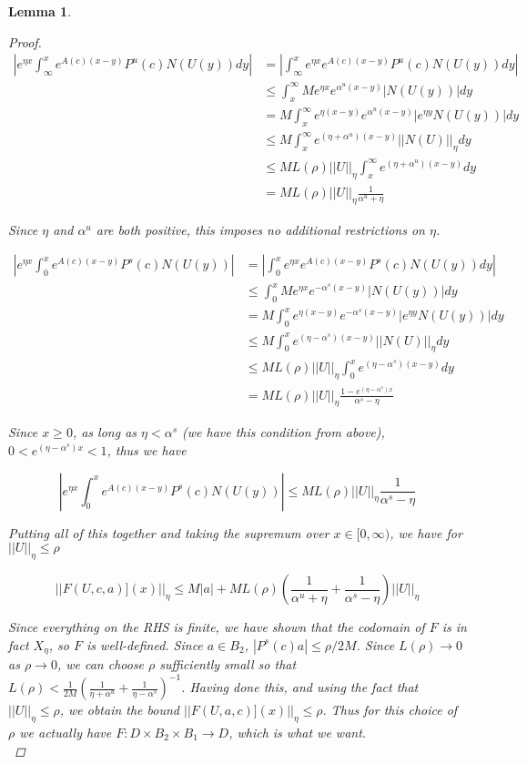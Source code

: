 \documentclass[12pt]{article}
\newtheorem{lemma}{Lemma}
\begin{document}
\begin{lemma}
\begin{proof}
\begin{align*}
\left| e^{\eta x} \int_\infty^x e^{A(c)(x - y)}P^u(c) N(U(y))dy \right| &= \left| \int_\infty^x e^{\eta x} e^{A(c)(x - y)}P^u(c) N(U(y))dy \right|\\
&\leq \int_x^\infty M e^{\eta x}e^{\alpha^u(x -y)}|N(U(y))|dy \\
&= M \int_x^\infty e^{\eta (x - y)}e^{\alpha^u(x -y)}| e^{\eta y} N(U(y))|dy \\
&\leq M \int_x^\infty e^{(\eta+\alpha^u)(x - y)} || N(U)||_\eta dy \\
&\leq M L(\rho) ||U||_\eta \int_x^\infty e^{(\eta+\alpha^u)(x - y)} dy \\
&= M L(\rho) ||U||_\eta \frac{1}{\alpha^u + \eta}
\end{align*}

Since $\eta$ and $\alpha^u$ are both positive, this imposes no additional restrictions on $\eta$.

\begin{align*}
\left| e^{\eta x} \int_0^x e^{A(c)(x - y)}P^s(c) N(U(y)) \right| &= \left| \int_0^x e^{\eta x} e^{A(c)(x - y)}P^s(c) N(U(y)) dy \right|\\
&\leq \int_0^x M e^{\eta x}e^{-\alpha^s(x -y)}|N(U(y))|dy \\
&= M \int_0^x e^{\eta (x - y)}e^{-\alpha^s(x -y)}| e^{\eta y} N(U(y))|dy \\
&\leq M \int_0^x e^{(\eta-\alpha^s)(x - y)} || N(U)||_\eta dy \\
&\leq M L(\rho) ||U||_\eta \int_0^x e^{(\eta-\alpha^s)(x - y)} dy \\
&= M L(\rho) ||U||_\eta \frac{1 - e^{(\eta-\alpha^s)x} }{\alpha^s - \eta}
\end{align*}

Since $x \geq 0$, as long as $\eta < \alpha^s$ (we have this condition from above), $0 < e^{(\eta-\alpha^s)x} < 1$, thus we have

\[
\left| e^{\eta x} \int_0^x e^{A(c)(x - y)}P^s(c) N(U(y)) \right| \leq M L(\rho) ||U||_\eta \frac{1}{\alpha^s - \eta}
\]

Putting all of this together and taking the supremum over $x \in [0, \infty)$, we have for $||U||_\eta \leq \rho$

\begin{equation}
||F(U, c, a)](x)||_\eta \leq M |a| + M L(\rho) \left( \frac{1}{\alpha^u+\eta}+\frac{1}{\alpha^s-\eta} \right) ||U||_\eta
\end{equation}

Since everything on the RHS is finite, we have shown that the codomain of $F$ is in fact $X_\eta$, so $F$ is well-defined. Since $a \in B_2$, $|P^s(c) a| \leq \rho/2M$. Since $L(\rho) \rightarrow 0$ as $\rho \rightarrow 0$, we can choose $\rho$ sufficiently small so that $L(\rho) < \frac{1}{2M} \left( \frac{1}{\eta+\alpha^u}+\frac{1}{\eta-\alpha^s} \right)^{-1}$. Having done this, and using the fact that $||U||_\eta \leq \rho$, we obtain the bound $||F(U, a, c)](x)||_\eta \leq \rho$. Thus for this choice of $\rho$ we actually have $F: D \times B_2 \times B_1 \rightarrow D$, which is what we want.\\


\end{proof}
\end{lemma}
\end{document}
